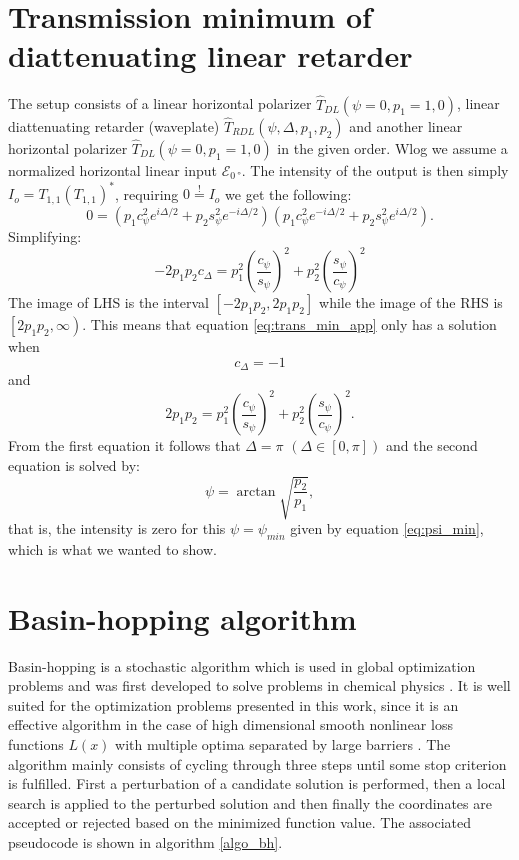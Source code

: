 \section{Transmission minimum of diattenuating linear retarder} %
\label{sec:transmission_min}
The setup consists of a linear horizontal polarizer $\hat{T}_{DL}(\psi=0, p_1=1, 0)$, linear diattenuating retarder (waveplate) $\hat{T}_{RDL}(\psi, \Delta, p_1, p_2)$ and another linear horizontal polarizer $\hat{T}_{DL}(\psi=0, p_1=1, 0)$ in the given order. Wlog we assume a normalized horizontal linear input $\bm{\mathcal{E}}_{\SI{0}{\degree}}$. The intensity of the output is then simply $I_o=T_{1,1}(T_{1,1})^*$, requiring $0\overset{!}{=}I_o$ we get the following:
\begin{equation}
    0=(p_1c_\psi^2e^{i\Delta/2}+p_2s_\psi^2e^{-i\Delta/2})(p_1c_\psi^2e^{-i\Delta/2}+p_2s_\psi^2e^{i\Delta/2}).
\end{equation}
Simplifying:
\begin{equation}
    \label{eq:trans_min_app}
    -2p_1p_2c_\Delta = p_1^2\left(\frac{c_\psi}{s_\psi}\right)^2 + p_2^2\left(\frac{s_\psi}{c_\psi}\right)^2
\end{equation}
The image of LHS is the interval $\left[-2p_1p_2, 2p_1p_2\right]$ while the image of the RHS is $\left[2p_1p_2, \infty\right)$. This means that equation \ref{eq:trans_min_app} only has a solution when
\begin{equation}
    c_\Delta=-1
\end{equation}
and
\begin{equation}
    2p_1p_2 = p_1^2\left(\frac{c_\psi}{s_\psi}\right)^2 + p_2^2\left(\frac{s_\psi}{c_\psi}\right)^2.
\end{equation}
From the first equation it follows that $\Delta=\pi$ $(\Delta \in [0,\pi])$ and the second equation is solved by:
\begin{equation}
    \label{eq:psi_min}
    \psi = \arctan \sqrt{\frac{p_2}{p_1}},
\end{equation}
that is, the intensity is zero for this $\psi=\psi_{min}$ given by equation \ref{eq:psi_min}, which is what we wanted to show.

\section{Basin-hopping algorithm}
\label{sec:basin_hopping_algo}

Basin-hopping is a stochastic algorithm which is used in global optimization problems and was first developed to solve problems in chemical physics \cite{Wales1997}. It is well suited for the optimization problems presented in this work, since it is an effective algorithm in the case of high dimensional smooth nonlinear loss functions $L(x)$ with multiple optima separated by large barriers \cite{Olson2012, Wu2020}. The algorithm mainly consists of cycling through three steps until some stop criterion is fulfilled. First a perturbation of a candidate solution is performed, then a local search is applied to the perturbed solution and then finally the coordinates are accepted or rejected based on the minimized function value. The associated pseudocode is shown in algorithm \ref{algo_bh}. 

